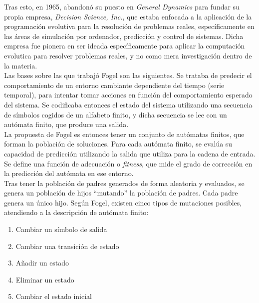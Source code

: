 \documentclass[12pt]{article} \usepackage[utf8x]{inputenc}
\begin{document}
Tras esto, en 1965, abandonó su puesto en \textit{General Dynamics}
para fundar su propia empresa, \textit{Decision Science, Inc.}, que
estaba enfocada a la aplicación de la programación evolutiva para la
resolución de problemas reales, específicamente en las áreas de
simulación por ordenador, predicción y control de sistemas. Dicha
empresa fue pionera en ser ideada específicamente para aplicar la
computación evolutica para resolver problemas reales, y no como mera
investigación dentro de la materia.\\

Las bases sobre las que trabajó Fogel son las siguientes. Se trataba
de predecir el comportamiento de un entorno cambiante dependiente del
tiempo (serie temporal), para intentar tomar acciones en función del
comportamiento esperado del sistema. Se codificaba entonces el estado
del sistema utilizando una secuencia de símbolos cogidos de un
alfabeto finito, y dicha secuencia se lee con un autómata finito, que
produce una salida.\\

La propuesta de Fogel es entonces tener un conjunto de autómatas
finitos, que forman la población de soluciones. Para cada autómata
finito, se evalúa su capacidad de predicción utilizando la salida que
utiliza para la cadena de entrada. Se define una función de adecuación
o \textit{fitness}, que mide el grado de corrección en la predicción
del autómata en ese entorno.\\

Tras tener la población de padres generados de forma aleatoria y
evaluados, se genera un población de hijos ``mutando'' la población de
padres. Cada padre genera un único hijo. Según Fogel, existen cinco
tipos de mutaciones posibles, atendiendo a la descripción de autómata
finito:

\begin{enumerate}
\item Cambiar un símbolo de salida
\item Cambiar una transición de estado
\item Añadir un estado
\item Eliminar un estado
\item Cambiar el estado inicial
\end{enumerate}
\end{document}
